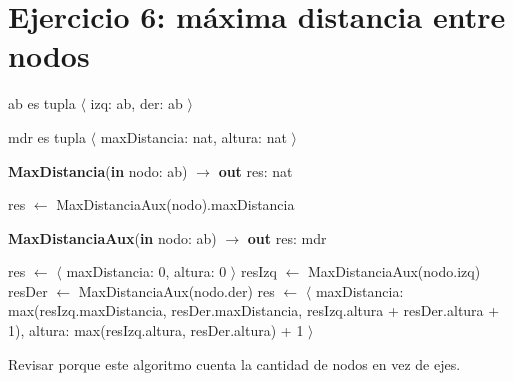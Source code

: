 \section{Ejercicio 6: máxima distancia entre nodos}

ab es tupla $\langle$ izq: ab, der: ab $\rangle$

mdr es tupla $\langle$ maxDistancia: nat, altura: nat $\rangle$

\begin{algorithm}[H]
\caption{
    \textbf{MaxDistancia}(\textbf{in} nodo: ab) $\to$ \textbf{out} res: nat
}
\begin{algorithmic}[1]
    \State res $\gets$ MaxDistanciaAux(nodo).maxDistancia
\end{algorithmic}
\Complexity{}
\end{algorithm}

\begin{algorithm}[H]
\caption{
    \textbf{MaxDistanciaAux}(\textbf{in} nodo: ab) $\to$ \textbf{out} res: mdr
}
\begin{algorithmic}[1]
        \State res $\gets$ $\langle$ maxDistancia: 0, altura: 0 $\rangle$
    \Else
        \State resIzq $\gets$ MaxDistanciaAux(nodo.izq)
        \State resDer $\gets$ MaxDistanciaAux(nodo.der)
        \State res $\gets$ $\langle$
        \State \;\; maxDistancia: max(resIzq.maxDistancia, resDer.maxDistancia, resIzq.altura + resDer.altura + 1),
        \State \;\; altura: max(resIzq.altura, resDer.altura) + 1
        \State $\rangle$
    \EndIf
\end{algorithmic}
\Complexity{}
\end{algorithm}

Revisar porque este algoritmo cuenta la cantidad de nodos en vez de ejes.

